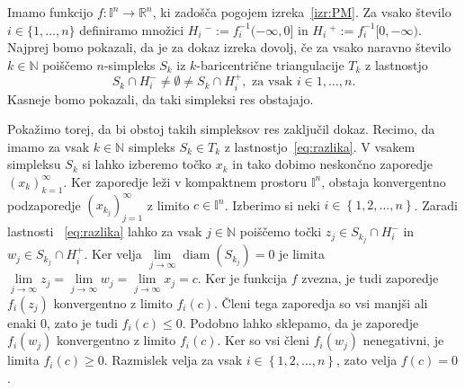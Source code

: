 \documentclass[mat1]{fmfdelo}
\newcommand{\R}{\mathbb R}
\newcommand{\N}{\mathbb N}
\DeclareMathOperator{\diam}{diam}
\newcommand{\I}{\mathbb I}
\newcommand{\0}{\underline{0}}
\begin{document}
\begin{dokaz}
Imamo funkcijo $f : \I^n \to  \R^n$, ki zadošča pogojem izreka~\ref{izr:PM}. Za vsako število $i \in \{ 1, \dots, n\}$ definiramo množici $H_i\ ^- := f_i^{-1} (-\infty, 0 ]$ in $H_i\ ^+ := f_i^{-1} [0, -\infty)$. Najprej bomo pokazali, da je za dokaz izreka dovolj, če za vsako naravno število $k \in \N$ poiščemo $n$-simpleks $S_k$ iz  $k$-baricentrične triangulacije $T_k$ z lastnostjo 
\begin{equation}\label{eq:razlika}
S_k \cap H_i^- \neq \emptyset \neq S_k \cap H_i^+, \text{ za vsak } i \in{1, \dots, n}.
\end{equation}
Kasneje bomo pokazali, da taki simpleksi res obstajajo.

Pokažimo torej, da bi obstoj takih simpleksov res zaključil dokaz. Recimo, da imamo za vsak $k \in \N$ simpleks $S_k \in T_k$ z lastnostjo~\eqref{eq:razlika}. V vsakem simpleksu $S_k$ si lahko izberemo točko $x_k$ in tako dobimo neskončno zaporedje $\left ( x_k \right ) _{k = 1}^{\infty}$. Ker zaporedje leži v kompaktnem prostoru $\I^n$, obstaja konvergentno podzaporedje $\left ( x_{k_j} \right ) _{j = 1}^{\infty}$ z limito $c \in \I^n$. Izberimo si neki $i \in \left \{1, 2, \dots, n\right \}$. Zaradi lastnosti ~\eqref{eq:razlika} lahko za vsak $j \in \N$ poiščemo točki $z_j \in S_{k_j} \cap H_i^-$ in $w_j \in S_{k_j} \cap H_i^+$. Ker velja $\lim\limits_{j \to \infty} \diam(S_{k_j}) = 0$ je limita  $\lim\limits_{j \to \infty} z_j = \lim\limits_{j \to \infty} w_j = \lim\limits_{j \to \infty} x_j = c$. Ker je funkcija $f$ zvezna, je tudi zaporedje $f_i(z_j)$ konvergentno z limito $f_i(c)$. Členi tega zaporedja so vsi manjši ali enaki $0$, zato je tudi $f_i(c) \leq 0$. Podobno lahko sklepamo, da je zaporedje $f_i(w_j)$ konvergentno z limito $f_i(c)$. Ker so vsi členi $f_i(w_j)$ nenegativni, je limita $f_i(c) \geq 0$. Razmislek velja za vsak $i \in \left \{1, 2, \dots, n\right \}$, zato velja $f(c) = 0$.

\begin{figure}[h!]
	\centering
\end{figure}
\end{dokaz}
\end{document}
